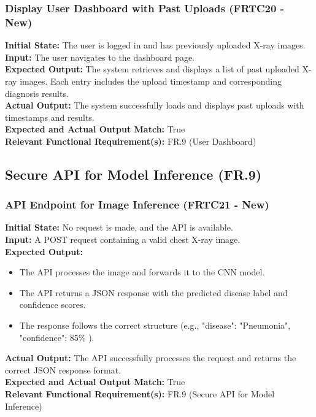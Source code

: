 \documentclass[12pt, titlepage]{article}
\begin{document}
\subsubsection{Display User Dashboard with Past Uploads (FRTC20 - New)}
\textbf{Initial State:} The user is logged in and has previously uploaded X-ray images.\\
\textbf{Input:} The user navigates to the dashboard page.\\
\textbf{Expected Output:} The system retrieves and displays a list of past uploaded X-ray images. Each entry includes the upload timestamp and corresponding diagnosis results.\\
\textbf{Actual Output:} The system successfully loads and displays past uploads with timestamps and results.\\
\textbf{Expected and Actual Output Match:} True\\
\textbf{Relevant Functional Requirement(s):} FR.9 (User Dashboard)\\

\subsection{Secure API for Model Inference (FR.9)}
\subsubsection{API Endpoint for Image Inference (FRTC21 - New)}
\textbf{Initial State:} No request is made, and the API is available.\\
\textbf{Input:} A POST request containing a valid chest X-ray image.\\
\textbf{Expected Output:}
\begin{itemize}
\item The API processes the image and forwards it to the CNN model.
\item The API returns a JSON response with the predicted disease label and confidence scores.
\item The response follows the correct structure (e.g., { "disease": "Pneumonia", "confidence": 85\% }).
\end{itemize}
\textbf{Actual Output:} The API successfully processes the request and returns the correct JSON response format.\\
\textbf{Expected and Actual Output Match:} True\\
\textbf{Relevant Functional Requirement(s):} FR.9 (Secure API for Model Inference)\\
\end{document}
